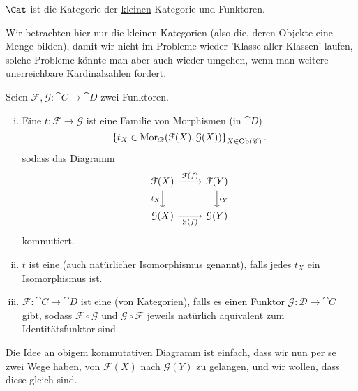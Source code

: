 \begin{example}
    $\Cat$ ist die Kategorie der  \underline{kleinen} Kategorie und Funktoren. 
\end{example}

\begin{oral}
    Wir betrachten hier nur die kleinen Kategorien (also die, deren Objekte eine Menge bilden), damit wir nicht im Probleme wieder 'Klasse aller Klassen' laufen, solche Probleme könnte man aber auch wieder umgehen, wenn man weitere unerreichbare Kardinalzahlen fordert.
\end{oral}

\begin{definition}\label{def:natürliche-transformation-und-äquivalenz}
    Seien $\mathcal{F},\mathcal{G}\colon  \cat{C} \to  \cat{D}$ zwei Funktoren. 
    \begin{enumerate}[i)]
        \item 
    Eine  $t\colon  \mathcal{F} \to  \mathcal{G}$ ist eine Familie von Morphismen (in $\cat{D}$)
    \[
        \left \{t_X \in  \operatorname{Mor}_{\mathscr{D}}(\mathcal{F}(X),\mathcal{G}(X))\right\} _{X\in \operatorname{Ob}(\mathscr{C})}
    .\] 
    sodass das Diagramm
    \begin{equation*}
        \begin{tikzcd}
            \mathcal{F}(X) \ar{r}{\mathcal{F}(f)} \ar[swap]{d}{t_X} & \mathcal{F}(Y) \ar{d}{t_{Y}} \\
            \mathcal{G}(X) \ar[swap]{r}{\mathcal{G}(f)} & \mathcal{G}(Y)
        \end{tikzcd}
    \end{equation*}
    kommutiert.
\item $t$ ist eine   (auch natürlicher Isomorphismus genannt), falls jedes $t_X$ ein Isomorphismus ist. 
\item $\mathcal{F}\colon  \cat{C} \to  \cat{D}$ ist eine  (von Kategorien), falls es einen Funktor $\mathcal{G} \colon  \mathcal{D} \to  \cat{C}$ gibt, sodass $\mathcal{F} \circ  \mathcal{G}$ und $\mathcal{G} \circ  \mathcal{F}$ jeweils natürlich äquivalent zum Identitätsfunktor sind.
    \end{enumerate}
\end{definition}

\begin{remark*}
    Die Idee an obigem kommutativen Diagramm ist einfach, dass wir nun per se zwei Wege haben, von $\mathcal{F}(X)$ nach $\mathcal{G}(Y)$ zu gelangen, und wir wollen, dass diese gleich sind.
\end{remark*}


